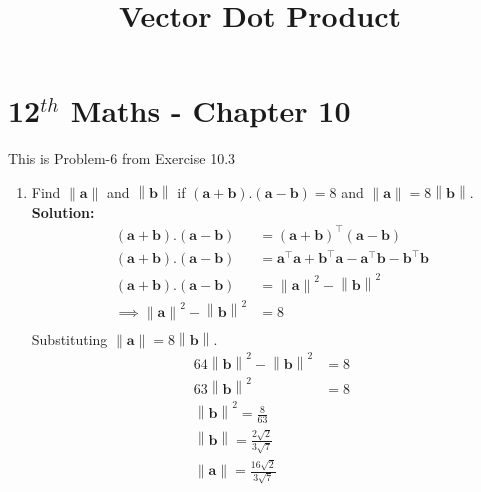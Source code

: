 \documentclass[12pt]{article}
\providecommand{\brak}[1]{\ensuremath{\left(#1\right)}}
\providecommand{\norm}[1]{\left\lVert#1\right\rVert}
\newcommand{\solution}{\noindent \textbf{Solution: }}
\let\vec\mathbf
\begin{document}
\begin{center}
\title{\textbf{Vector Dot Product}}
\date{\vspace{-5ex}} %
\maketitle
\end{center}
\setcounter{page}{1}

\section{12$^{th}$ Maths - Chapter 10}
This is Problem-6 from Exercise 10.3
\begin{enumerate}
\item Find $\norm{\vec{a}}$ and $\norm{\vec{b}}$ if 
$\brak{\vec{a}+\vec{b}}.\brak{\vec{a}-\vec{b}} = 8$ 
and $\norm{\vec{a}}=8\norm{\vec{b}}$.\\
\solution 
\begin{align}
  \label{eq:det2f}
  \brak{\vec{a}+\vec{b}}.\brak{\vec{a}-\vec{b}} & =\brak{\vec{a}+\vec{b}}^\top\brak{\vec{a}-\vec{b}} \\
  \brak{\vec{a}+\vec{b}}.\brak{\vec{a}-\vec{b}} & =\vec{a}^\top\vec{a} + \vec{b}^\top\vec{a} - \vec{a}^\top\vec{b} - \vec{b}^\top\vec{b}\\
  \brak{\vec{a}+\vec{b}}.\brak{\vec{a}-\vec{b}} & =\norm{\vec{a}}^{2} - \norm{\vec{b}}^{2} \\
  \implies \norm{\vec{a}}^{2} - \norm{\vec{b}}^{2} &= 8 \\
  \end{align}
  \text Substituting $\norm{\vec{a}}=8\norm{\vec{b}}$.\\
  \begin{align}
  64\norm{\vec{b}}^{2} - \norm{\vec{b}}^{2} &= 8 \\
  63\norm{\vec{b}}^{2} &= 8 \\
  \norm{\vec{b}}^{2} = \frac{8}{63} \\
  \norm{\vec{b}} = \frac{2\sqrt{2}}{3\sqrt{7}}\\
  \norm{\vec{a}} = \frac{16\sqrt{2}}{3\sqrt{7}}
\end{align}
\end{enumerate}
\end{document}
